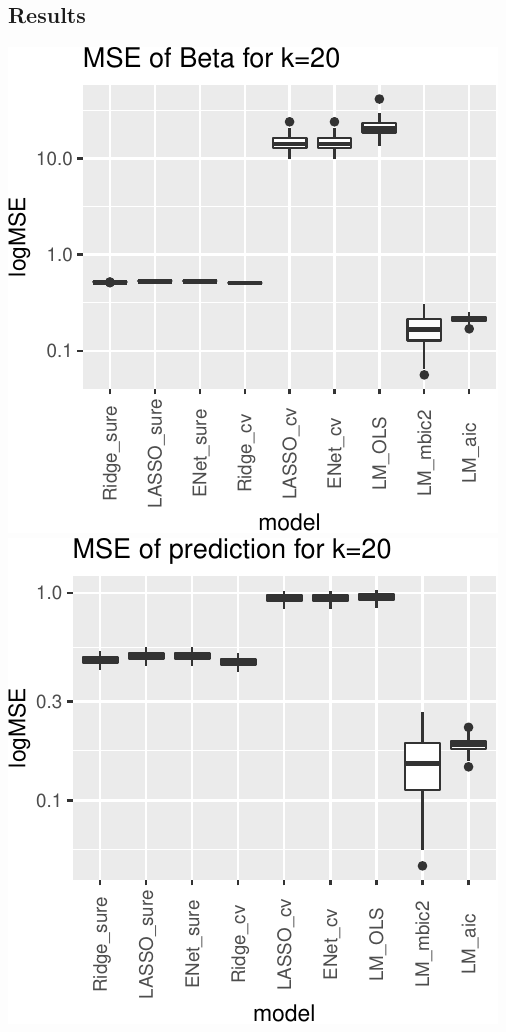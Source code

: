 \documentclass[
]{article}
\begin{document}
\hypertarget{results-2}{%
\subsection{Results}\label{results-2}}

\includegraphics[width=0.8\linewidth]{report_files/figure-latex/unnamed-chunk-10-1}
\includegraphics[width=0.8\linewidth]{report_files/figure-latex/unnamed-chunk-10-2}
\end{document}
